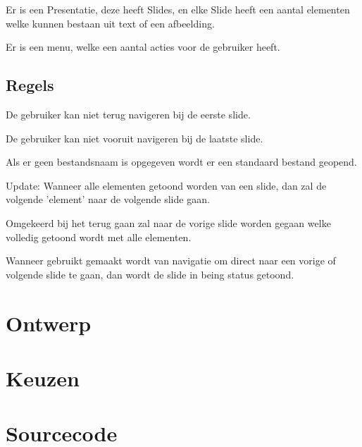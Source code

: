 \documentclass[a4paper]{article}
\begin{document}
Er is een Presentatie, deze heeft Slides, en elke Slide heeft een aantal
elementen welke kunnen bestaan uit text of een afbeelding.

Er is een menu, welke een aantal acties voor de gebruiker heeft.

\subsection{Regels}
De gebruiker kan niet terug navigeren bij de eerste slide.

De gebruiker kan niet vooruit navigeren bij de laatste slide.

Als er geen bestandsnaam is opgegeven wordt er een standaard bestand geopend.

Update: Wanneer alle elementen getoond worden van een slide, dan zal de volgende
'element' naar de volgende slide gaan.

Omgekeerd bij het terug gaan zal naar de vorige slide worden gegaan welke
volledig getoond wordt met alle elementen.

Wanneer gebruikt gemaakt wordt van navigatie om direct naar een vorige of
volgende slide te gaan, dan wordt de slide in being status getoond.

\section{Ontwerp}


\section{Keuzen}



\section{Sourcecode}
\end{document}
